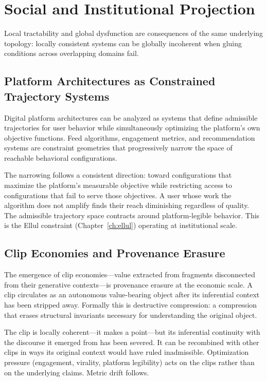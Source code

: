 \chapter{Social and Institutional Projection}
\label{ch:social_institutional}

\epigraph{Local tractability and global dysfunction are consequences of the same
underlying topology: locally consistent systems can be globally incoherent when
gluing conditions across overlapping domains fail.}{}

\section{Platform Architectures as Constrained Trajectory Systems}

\claimP Digital platform architectures can be analyzed as systems that define
admissible trajectories for user behavior while simultaneously optimizing the
platform's own objective functions. Feed algorithms, engagement metrics, and
recommendation systems are constraint geometries that progressively narrow the
space of reachable behavioral configurations.

The narrowing follows a consistent direction: toward configurations that maximize
the platform's measurable objective while restricting access to configurations
that fail to serve those objectives. A user whose work the algorithm does not
amplify finds their reach diminishing regardless of quality. The admissible
trajectory space contracts around platform-legible behavior. This is the Ellul
constraint (Chapter~\ref{ch:ellul}) operating at institutional scale.

\section{Clip Economies and Provenance Erasure}

\claimP The emergence of clip economies---value extracted from fragments disconnected
from their generative contexts---is provenance erasure at the economic scale. A
clip circulates as an autonomous value-bearing object after its inferential
context has been stripped away. Formally this is destructive compression: a
compression that erases structural invariants necessary for understanding the
original object.

The clip is locally coherent---it makes a point---but its inferential continuity
with the discourse it emerged from has been severed. It can be recombined with
other clips in ways its original context would have ruled inadmissible.
Optimization pressure (engagement, virality, platform legibility) acts on the
clips rather than on the underlying claims. Metric drift follows.

